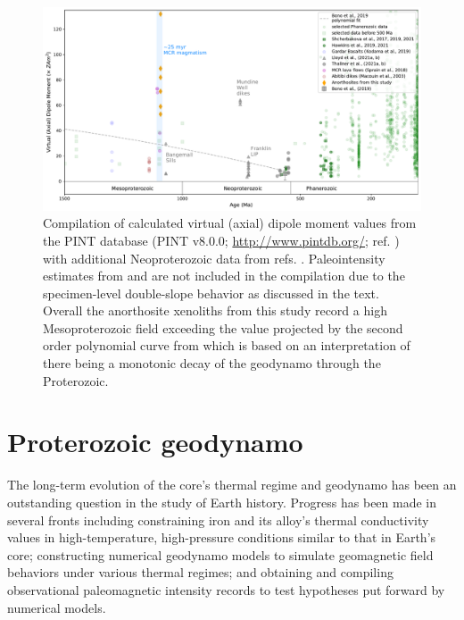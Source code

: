 \documentclass[9pt,twocolumn,twoside,lineno]{pnas-new}
\begin{document}
\begin{figure}[h!]
\noindent\includegraphics[width=17.8 cm]{PINT_compilation.pdf}
\centering
\caption{\footnotesize{Compilation of calculated virtual (axial) dipole moment values from the PINT database (PINT v8.0.0; \url{http://www.pintdb.org/}; ref. \citealp{Bono2021a}) with additional Neoproterozoic data from refs. \citealp{Lloyd2021a, Lloyd2021b, Thallner2021a, Thallner2021b}. Paleointensity estimates from \cite{Pesonen1983a} and \cite{Kulakov2013a} are not included in the compilation due to the specimen-level double-slope behavior as discussed in the text. Overall the anorthosite xenoliths from this study record a high Mesoproterozoic field exceeding the value projected by the second order polynomial curve from \cite{Bono2019a} which is based on an interpretation of there being a monotonic decay of the geodynamo through the Proterozoic.}}
\label{fig:PINT_compilation}
\end{figure}

\section*{Proterozoic geodynamo}

The long-term evolution of the core's thermal regime and geodynamo has been an outstanding question in the study of Earth history. Progress has been made in several fronts including constraining iron and its alloy's thermal conductivity values in high-temperature, high-pressure conditions similar to that in Earth's core; constructing numerical geodynamo models to simulate geomagnetic field behaviors under various thermal regimes; and obtaining and compiling observational paleomagnetic intensity records to test hypotheses put forward by numerical models. 
\end{document}
